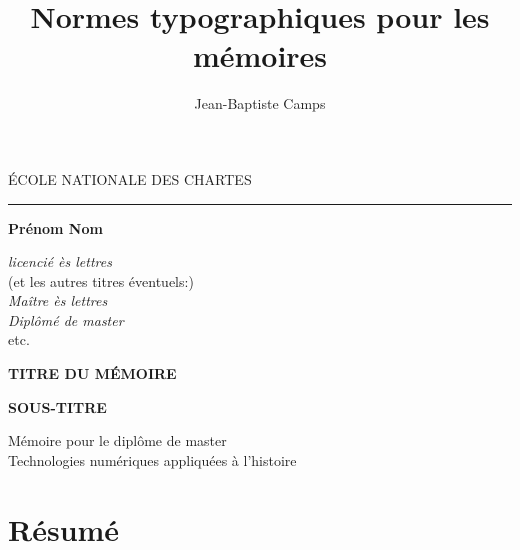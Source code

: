 \documentclass[a4paper,12pt]{book}
\title{Normes typographiques pour les mémoires}
\author{Jean-Baptiste Camps}
\begin{document}

\frontmatter

\begin{titlepage}
\begin{center}

\bigskip

\begin{large}
\'ECOLE NATIONALE DES CHARTES
\end{large}
\begin{center}\rule{2cm}{0.02cm}\end{center}

\bigskip
\bigskip
\bigskip
\begin{Large}
\textbf{Prénom Nom}\\
\end{Large}
\begin{normalsize} \textit{licencié ès lettres}\\
 (et les autres titres éventuels:)\\
\textit{Maître ès lettres}\\
\textit{Diplômé de master}\\
etc.
\end{normalsize}

\bigskip
\bigskip
\bigskip

\begin{Huge}
\textbf{TITRE DU MÉMOIRE}\\
\end{Huge}
\bigskip
\bigskip
\begin{LARGE}
\textbf{SOUS-TITRE}\\
\end{LARGE}

\bigskip
\bigskip
\bigskip
\begin{large}
\end{large}
\vfill

\begin{large}
Mémoire 
pour le diplôme de master \\
\og Technologies numériques appliquées à l'histoire \fg{} \\
\end{large}

\end{center}
\end{titlepage}

\thispagestyle{empty}

\cleardoublepage

\section*{Résumé}
\end{document}
